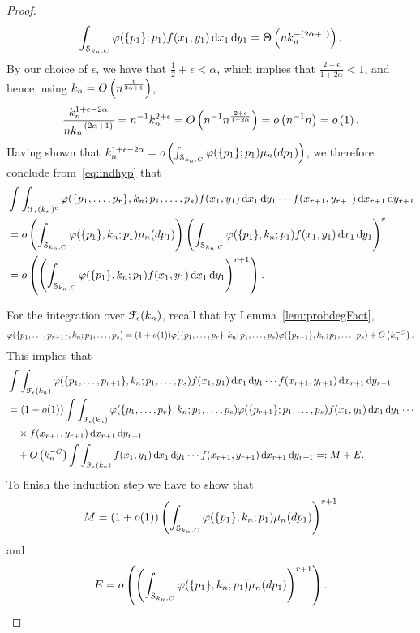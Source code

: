 \begin{proof}
\begin{align*}
\int_{\mathcal{S}_{k_n,C}} \varphi(\{p_1\};p_1) f(x_1,y_1) \operatorname{\mathrm{d}\hspace{-2pt}} x_1 \operatorname{\mathrm{d}\hspace{-2pt}} y_1 = \Theta\left(n k_n^{-(2\alpha+1)}\right).
\end{align*}
By our choice of $\epsilon$, we have that $\frac{1}{2}+\epsilon<\alpha$, which implies that $\frac{2+\epsilon}{1+2\alpha}<1$, and hence, using $k_n = O\left(n^{\frac{1}{2\alpha+1}}\right)$,
\begin{align*}
\frac{k_n^{1+\epsilon-2\alpha}}{nk_n^{-(2\alpha+1)}} = n^{-1} k_n^{2+\epsilon} = O\left(n^{-1} n^{\frac{2+\epsilon}{1+2\alpha}}\right) = o\left(n^{-1}n\right)= o\left(1\right).
\end{align*}
Having shown that $k_n^{1+\epsilon-2\alpha} = o\left(\int_{\mathcal{S}_{k_n,C}} \varphi(\{p_1\};p_1)\mu_n(dp_1)\right)$, we therefore conclude from~\eqref{eq:indhyp} that
\begin{align*}
	&\int \int_{\mathcal{F}_\epsilon(k_n)^c} \varphi(\{p_1,\dots,p_r\}, k_n ;p_1,\dots,p_s)
		f(x_1,y_1) \operatorname{\mathrm{d}\hspace{-2pt}} x_1 \operatorname{\mathrm{d}\hspace{-2pt}} y_1 \cdots f(x_{r+1},y_{r+1})\operatorname{\mathrm{d}\hspace{-2pt}} x_{r+1} \operatorname{\mathrm{d}\hspace{-2pt}} y_{r+1}\\
	&=o\left(\int_{\mathcal{S}_{k_n,C}} \varphi(\{p_1\}, k_n ;p_1)\mu_n(dp_1)\right)
		\left(\int_{\mathcal{S}_{k_n,C}} \varphi(\{p_1\}, k_n ;p_1) f(x_1,y_1) \operatorname{\mathrm{d}\hspace{-2pt}} x_1 \operatorname{\mathrm{d}\hspace{-2pt}} y_1\right)^r  \\
	&=o\left(\left(\int_{\mathcal{S}_{k_n,C}} \varphi(\{p_1\}, k_n ;p_1)f(x_1,y_1) \operatorname{\mathrm{d}\hspace{-2pt}} x_1 \operatorname{\mathrm{d}\hspace{-2pt}} y_1\right)^{r+1}\right).
\end{align*}

For the integration over $\mathcal{F}_\epsilon(k_n)$, recall that by Lemma~\ref{lem:probdegFact}, \[
	\varphi(\{p_1,\dots,p_{r+1}\}, k_n ;p_1,\dots,p_s)
	=(1+o(1))\varphi(\{p_1,\dots,p_r\}, k_n ;p_1,\dots,p_s)
	\varphi(\{p_{r+1}\}, k_n ;p_1,\dots,p_s)+O\left(k_n^{-C}\right).
\]
This implies that
\begin{align*}
	&\int \int_{\Fcal_\epsilon(k_n)} \varphi(\{p_1,\dots,p_{r+1}\}, k_n ;p_1,\dots,p_s) 
		 f(x_1,y_1) \dd x_1 \dd y_1 \cdots f(x_{r+1},y_{r+1})\dd x_{r+1} \dd y_{r+1}\\
	&=(1+o(1))\int \int_{\Fcal_\epsilon(k_n)} \varphi(\{p_1,\dots,p_r\}, k_n ;p_1,\dots,p_s) 
		\varphi(\{p_{r+1}\};p_1,\dots,p_s) f(x_1,y_1) \dd x_1 \dd y_1 \cdots \\
	&\hspace{10pt} \times f(x_{r+1},y_{r+1})\dd x_{r+1} \dd y_{r+1}\\
	&\hspace{10pt}+\bigO{k_n^{-C}}\int \int_{\Fcal_\epsilon(k_n)} 
		f(x_1,y_1) \dd x_1 \dd y_1 \cdots f(x_{r+1},y_{r+1})\dd x_{r+1} \dd y_{r+1} =:M+E.
\end{align*}
To finish the induction step we have to show that
\begin{align*}
M=(1+o(1)) \left(\int_{\mathcal{S}_{k_n,C}} \varphi(\{p_1\}, k_n ;p_1)\mu_n(dp_1)\right)^{r+1}
\end{align*}
and
\begin{align*}
E=o\left(\left(\int_{\mathcal{S}_{k_n,C}} \varphi(\{p_1\}, k_n ;p_1)\mu_n(dp_1)\right)^{r+1}\right).
\end{align*}


\end{proof}
